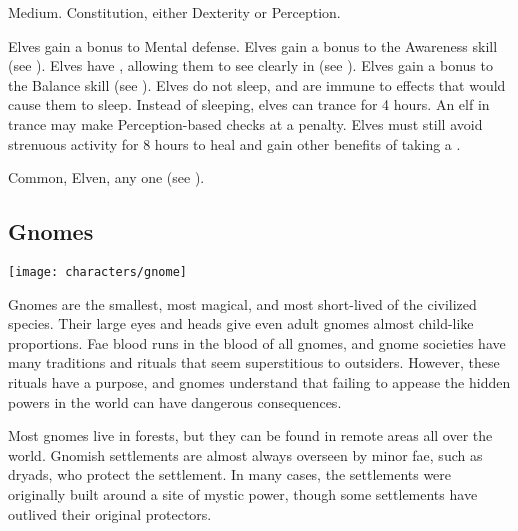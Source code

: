          Medium.
          Constitution, either  Dexterity or  Perception.
        \begin{raggeditemize}
             Elves gain a  bonus to Mental defense.
             Elves gain a  bonus to the Awareness skill (see ).
             Elves have , allowing them to see clearly in  (see ).
             Elves gain a  bonus to the Balance skill (see ).
             Elves do not sleep, and are immune to \magical effects that would cause them to sleep.
                Instead of sleeping, elves can trance for 4 hours.
                An elf in trance may make Perception-based checks at a  penalty.
                Elves must still avoid strenuous activity for 8 hours to heal and gain other benefits of taking a .
        \end{raggeditemize}
         Common, Elven, any one  (see ).

    \subsection{Gnomes}
        \texttt{[image: characters/gnome]}

        Gnomes are the smallest, most magical, and most short-lived of the civilized species.
        Their large eyes and heads give even adult gnomes almost child-like proportions.
        Fae blood runs in the blood of all gnomes, and gnome societies have many traditions and rituals that seem superstitious to outsiders.
        However, these rituals have a purpose, and gnomes understand that failing to appease the hidden powers in the world can have dangerous consequences.

        Most gnomes live in forests, but they can be found in remote areas all over the world.
        Gnomish settlements are almost always overseen by minor fae, such as dryads, who protect the settlement.
        In many cases, the settlements were originally built around a site of mystic power, though some settlements have outlived their original protectors.

